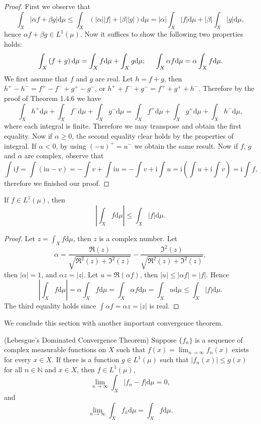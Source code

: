 \begin{proof}
First we observe that 
$$
\int_X{\left| \alpha f+\beta g \right|\mathrm{d}\mu}\le \int_X{\left( \left| \alpha \right|\left| f \right|+\left| \beta \right|\left| g \right| \right) \mathrm{d}\mu}=\left| \alpha \right|\int_X{\left| f \right|\mathrm{d}\mu}+\left| \beta \right|\int_X{\left| g \right|\mathrm{d}\mu},
$$
hence $\alpha f+\beta g\in L^1(\mu)$. Now it suffices to show the following two properties holds:
$$
\int_X{\left( f+g \right) \mathrm{d}\mu}=\int_X{f\mathrm{d}\mu}+\int_X{g\mathrm{d}\mu};\hspace{0.5cm}\int_X{\alpha f\mathrm{d}\mu}=\alpha \int_X{f\mathrm{d}\mu}.
$$
We first assume that $f$ and $g$ are real. Let $h=f+g$, then $h^+-h^-=f^+-f^-+g^+-g^-$, or $h^++f^-+g^-=f^++g^++h^-$. Therefore by the proof of Theorem 1.4.6 we have 
$$
\int_X{h^+\mathrm{d}\mu}+\int_X{f^-\mathrm{d}\mu}+\int_X{g^-\mathrm{d}\mu}=\int_X{f^+\mathrm{d}\mu}+\int_X{g^+\mathrm{d}\mu}+\int_X{h^-\mathrm{d}\mu},
$$
where each integral is finite. Therefore we may transpose and obtain the first equality. Now if $\alpha\ge 0$, the second equality clear holds by the properties of integral. If $\alpha<0$, by using $(-u)^+=u^-$ we obtain the same result. Now if $f$, $g$ and $\alpha$ are complex, observe that 
$$
\int{\mathrm{i}f}=\int{\left( \mathrm{i}u-v \right)}=-\int{v}+\int{\mathrm{i}u}=-\int{v}+\mathrm{i}\int{u}=\mathrm{i}\left( \int{u}+\mathrm{i}\int{v} \right) =\mathrm{i}\int{f},
$$
therefore we finished our proof.
\end{proof}
\begin{theorem}
If $f\in L^1(\mu)$, then 
$$\left|\int_Xf\mathrm{d}\mu\right|\le\int_X|f|\mathrm{d}\mu.$$
\end{theorem}
\begin{proof}
Let $z=\int_Xf\mathrm{d}\mu$, then $z$ is a complex number. Let 
$$
\alpha =\frac{\Re \left( z \right)}{\sqrt{\Re ^2\left( z \right) +\Im ^2\left( z \right)}}-\frac{\Im ^2\left( z \right)}{\sqrt{\Re ^2\left( z \right) +\Im ^2\left( z \right)}},
$$
then $|\alpha|=1$, and $\alpha z=|z|$. Let $u=\Re(\alpha f)$, then $|u|\le|\alpha f|=|f|$. Hence 
$$
\left| \int_X{f\mathrm{d}\mu} \right|=\alpha \int_X{f\mathrm{d}\mu}=\int_X{\alpha f\mathrm{d}\mu}=\int_X{u\mathrm{d}\mu}\le \int_X{\left| f \right|\mathrm{d}\mu}.
$$
The third equality holds since $\int\alpha f=\alpha z=|z|$ is real.
\end{proof}
We conclude this section with another important convergence theorem.
\begin{theorem}(Lebesgue's Dominated Convergence Theorem)
Suppose $\{f_n\}$ is a sequence of complex measurable functions on $X$ such that $f(x)=\lim_{n\to\infty}f_n(x)$ exists for every $x\in X$. If there is a function $g\in L^1(\mu)$ such that $|f_n(x)|\le g(x)$ for all $n\in\mathbb{N}$ and $x\in X$, then $f\in L^1(\mu)$, 
$$\lim_{n\to\infty}\int_X|f_n-f|\mathrm{d}\mu=0,$$
and 
$$\lim_{n\to\infty}\int_Xf_n\mathrm{d}\mu=\int_Xf\mathrm{d}\mu.$$
\end{theorem}
